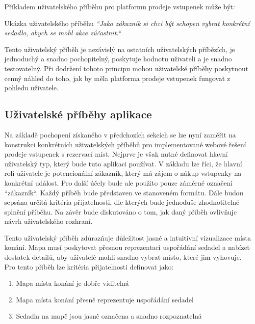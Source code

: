 Příkladem uživatelského příběhu pro platformu prodeje vstupenek může být:

\begin{gray-box}{Ukázka uživatelského příběhu}
    \textit{``Jako zákazník si chci být schopen vybrat konkrétní sedadlo, abych se mohl akce zúčastnit.``}
\end{gray-box}

Tento uživatelský příběh je nezávislý na ostatních uživatelských příbězích, je jednoduchý a snadno pochopitelný, poskytuje hodnotu uživateli a je snadno testovatelný.
Při dodržení tohoto principu mohou uživatelské příběhy poskytnout cenný náhled do toho, jak by měla platforma prodeje vstupenek fungovat z pohledu uživatele.

\subsection{Uživatelské příběhy aplikace}
\label{subsec:navrh-ui-uzivatelske-pribehy-aplikace}
Na základě pochopení získaného v předchozích sekcích se lze nyní zaměřit na konstrukci konkrétních uživatelských příběhů pro implementované webové řešení prodeje vstupenek s rezervací míst.
Nejprve je však nutné definovat hlavní uživatelský typ, který bude tuto aplikaci používat.
V základu lze říci, že hlavní rolí uživatele je potencionální zákazník, který má zájem o nákup vstupenky na konkrétní událost.
Pro další účely bude ale použito pouze záměrné označení ``zákazník``.
Každý příběh bude představen ve stanoveném formátu.
Dále budou sepsána určitá kritéria přijatelnosti, dle kterých bude jednoduše zhodnotitelné splnění příběhu.
Na závěr bude diskutováno o tom, jak daný příběh ovlivňuje návrh uživatelského rozhraní.

\newcommand{\userstoryvenuemap}{
}
\userstoryvenuemap

Tento uživatelský příběh zdůrazňuje důležitost jasné a intuitivní vizualizace místa konání.
Mapa musí poskytovat přesnou reprezentaci uspořádání sedadel a nabízet dostatek detailů, aby uživatelé mohli snadno vybrat místo, které jim vyhovuje.
Pro tento příběh lze kritéria přijatelnosti definovat jako:
\begin{enumerate}
    \item Mapa místa konání je dobře viditelná
    \item Mapa místa konání přesně reprezentuje uspořádání sedadel
    \item Sedadla na mapě jsou jasně označena a snadno rozpoznatelná
\end{enumerate}


